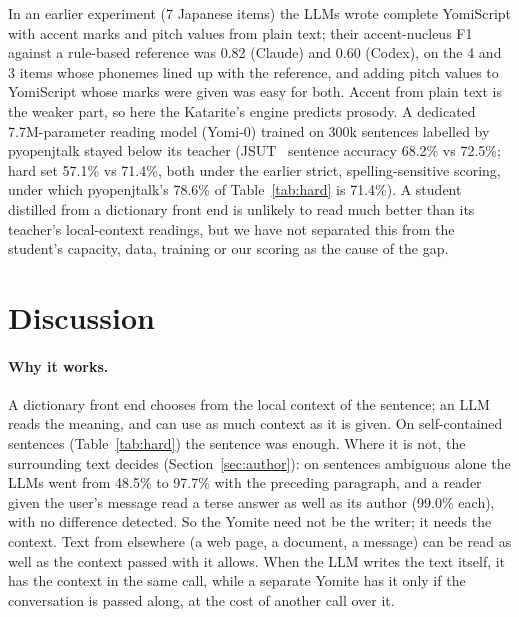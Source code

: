 \documentclass[11pt,a4paper]{article}
\begin{document}
In an earlier experiment (7 Japanese items) the LLMs wrote complete YomiScript with accent marks and pitch values from
plain text; their accent-nucleus F1 against a rule-based reference was 0.82 (Claude) and 0.60 (Codex), on the 4 and 3
items whose phonemes lined up with the reference, and adding pitch
values to YomiScript whose marks were given was easy for both. Accent from plain text is the weaker part, so here the
Katarite's engine predicts prosody. A dedicated 7.7M-parameter reading model (Yomi-0) trained on
300k sentences labelled by pyopenjtalk stayed below its teacher (JSUT~\citep{sonobe2017jsut,jsutlabel} sentence
accuracy 68.2\% vs 72.5\%; hard set 57.1\% vs 71.4\%, both under the earlier strict, spelling-sensitive scoring,
under which pyopenjtalk's 78.6\% of Table~\ref{tab:hard} is 71.4\%). A student distilled from a dictionary front end
is unlikely to read much better than its teacher's local-context readings, but we have not separated this from the student's capacity,
data, training or our scoring as the cause of the gap.

\section{Discussion}

\paragraph{Why it works.} A dictionary front end chooses from the local context of the sentence; an LLM reads the
meaning, and can use as much context as it is given. On self-contained sentences (Table~\ref{tab:hard}) the sentence
was enough. Where it is not, the surrounding text decides (Section~\ref{sec:author}): on sentences ambiguous alone
the LLMs went from 48.5\% to 97.7\% with the preceding paragraph, and a reader given the user's message read a terse
answer as well as its author (99.0\% each), with no difference detected. So the Yomite need not be the writer; it needs the context. Text from elsewhere (a web page, a document, a
message) can be read as well as the context passed with it allows. When the LLM writes the text itself, it has the
context in the same call, while a separate Yomite has it only if the conversation is passed along, at the cost of
another call over it.
\end{document}

